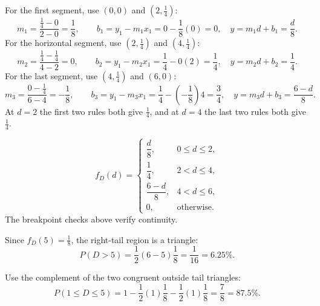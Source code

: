 	For the first segment, use $(0,0)$ and $(2,\frac14)$:
	\[
	m_1=\frac{\frac14-0}{2-0}=\frac18,\qquad
	b_1=y_1-m_1x_1=0-\frac18(0)=0,
	\quad y=m_1d+b_1=\frac d8.
	\]
	For the horizontal segment, use $(2,\frac14)$ and $(4,\frac14)$:
	\[
	m_2=\frac{\frac14-\frac14}{4-2}=0,\qquad
	b_2=y_1-m_2x_1=\frac14-0(2)=\frac14,
	\quad y=m_2d+b_2=\frac14.
	\]
	For the last segment, use $(4,\frac14)$ and $(6,0)$:
	\[
	m_3=\frac{0-\frac14}{6-4}=-\frac18,\qquad
	b_3=y_1-m_3x_1=\frac14-\left(-\frac18\right)4=\frac34,
	\quad y=m_3d+b_3=\frac{6-d}{8}.
	\]
	At $d=2$ the first two rules both give $\frac14$, and at $d=4$ the last two
	rules both give $\frac14$.
	
	\[
	f_D(d)=\begin{cases}
		\dfrac d8,&0\le d\le2,\\[1mm]
		\dfrac14,&2<d\le4,\\[1mm]
		\dfrac{6-d}{8},&4<d\le6,\\[1mm]
		0,&\text{otherwise.}
	\end{cases}
	\]
	The breakpoint checks above verify continuity.
	
	Since $f_D(5)=\frac18$, the right-tail region is a triangle:
	\[
	P(D>5)=\frac12(6-5)\frac18=\frac1{16}=6.25\%.
	\]
	
	Use the complement of the two congruent outside tail triangles:
	\[
	P(1\le D\le5)=1-\frac12(1)\frac18-\frac12(1)\frac18
	=\frac78=87.5\%.
	\]
	


